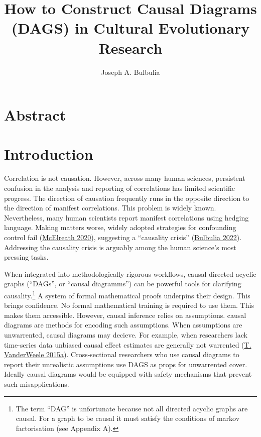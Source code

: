 \documentclass[
  singlecolumn]{report}
\title{How to Construct Causal Diagrams (DAGS) in Cultural Evolutionary
Research}
\author{Joseph A. Bulbulia}
\date{}
\begin{document}
\maketitle
\ifdefined\Shaded\renewenvironment{Shaded}{\begin{tcolorbox}[enhanced, sharp corners, breakable, borderline west={3pt}{0pt}{shadecolor}, interior hidden, boxrule=0pt, frame hidden]}{\end{tcolorbox}}\fi

\listoffigures
\listoftables
\hypertarget{abstract}{%
\section{Abstract}\label{abstract}}

\hypertarget{introduction}{%
\section{Introduction}\label{introduction}}

Correlation is not causation. However, across many human sciences,
persistent confusion in the analysis and reporting of correlations has
limited scientific progress. The direction of causation frequently runs
in the opposite direction to the direction of manifest correlations.
This problem is widely known. Nevertheless, many human scientists report
manifest correlations using hedging language. Making matters worse,
widely adopted strategies for confounding control fail
(\protect\hyperlink{ref-mcelreath2020}{McElreath 2020}), suggesting a
``causality crisis'' (\protect\hyperlink{ref-bulbulia2022}{Bulbulia
2022}). Addressing the causality crisis is arguably among the human
science's most pressing tasks.

When integrated into methodologically rigorous workflows, causal
directed acyclic graphs (``DAGs'', or ``causal diagramms'') can be
powerful tools for clarifying causality.\footnote{The term ``DAG'' is
  unfortunate because not all directed acyclic graphs are causal. For a
  graph to be causal it must satisfy the conditions of markov
  factorisation (see Appendix A).} A system of formal mathematical
proofs underpins their design. This brings confidence. No formal
mathematical training is required to use them. This makes them
accessible. However, causal inference relies on assumptions. causal
diagrams are methods for encoding such assumptions. When assumptions are
unwarrented, causal diagrams may decieve. For example, when researchers
lack time-series data unbiased causal effect estimates are generally not
warrented (\protect\hyperlink{ref-vanderweele2015}{T. VanderWeele
2015a}). Cross-sectional researchers who use causal diagrams to report
their unrealistic assumptions use DAGS as props for unwarrented cover.
Ideally causal diagrams would be equipped with safety mechanisms that
prevent such misapplications.
\end{document}
